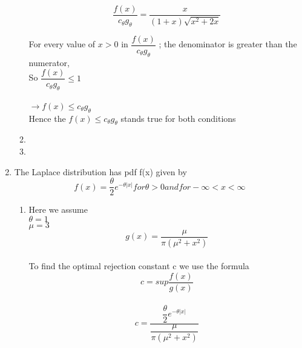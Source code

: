 \documentclass[letterpaper]{article}
\begin{document}
\begin{enumerate}
\begin{enumerate}
\begin{equation*}
\dfrac{f(x)}{c_{\theta}g_{\theta}} = \dfrac {x}{(1+x)\sqrt{x^2+2x}}
\end{equation*}

 For every value of $x > 0$ in $ \dfrac{f(x)}{c_{\theta}g_{\theta}}$ ; the denominator is greater than the numerator,\\

So $\dfrac{f(x)}{c_{\theta} g_{\theta}} \leq 1 $\\\\

$\rightarrow f(x) \leq c_{\theta} g_{\theta}$\\

Hence the $  f(x) \leq c_{\theta} g_{\theta} $ stands true for both conditions \\



\item 




\item




\end{enumerate} 

\item   The Laplace distribution has pdf f(x) given by\\

\begin{equation*}
f(x) =\dfrac{\theta}{2}e^{-\theta |x|}  for \theta >0  and for  -\infty <x <\infty
\end{equation*}

\begin{enumerate}
\item Here we assume \\
$\theta =1$\\
$\mu =3 $\\
\begin{equation*}
g(x)=\dfrac{\mu}{\pi(\mu^2 + x^2)}
\end {equation*}\\

To find the optimal rejection constant c we use the formula
\begin{equation*}
c=sup\dfrac{f(x)}{g(x)}
\end{equation*}\\

\begin{equation*}
c = \dfrac{\dfrac{\theta}{2}e^{-\theta |x|}}{\dfrac{\mu}{\pi(\mu^2 + x^2)}}
\end{equation*}\\


\end{enumerate}
\end{enumerate}
\end{document}
